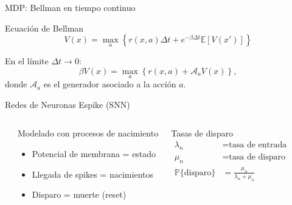 \documentclass[aspectratio=169]{beamer}
\theoremstyle{plain}
\theoremstyle{definition}
\newcommand{\E}{\mathbb{E}}
\newcommand{\Prob}{\mathbb{P}}
\newcommand{\1}{\mathbf{1}}
\begin{document}
\begin{frame}[t]{MDP: Bellman en tiempo continuo}
  \begin{block}{Ecuación de Bellman}
    \[
      V(x) = \max_a \left\{ r(x,a)\Delta t + e^{-\beta\Delta t}\E[V(x')] \right\}
    \]

    En el límite $\Delta t\to 0$:
    \[
      \beta V(x) = \max_a \left\{ r(x,a) + \mathcal{A}_a V(x) \right\},
    \]
    donde $\mathcal{A}_a$ es el generador asociado a la acción $a$.
  \end{block}
\end{frame}

\begin{frame}[t]{Redes de Neuronas Espike (SNN)}
  \begin{columns}
    \begin{center}
    \end{center}
    
    \begin{block}{Modelado con procesos de nacimiento}
      \begin{itemize}
        \item Potencial de membrana = estado
        \item Llegada de spikes = nacimientos
        \item Disparo = muerte (reset)
      \end{itemize}
    \end{block}
    
    \begin{block}{Tasas de disparo}
      \begin{align*}
        \lambda_n &= \text{tasa de entrada}\\
        \mu_n &= \text{tasa de disparo}\\
        \Prob\{\text{disparo}\} &= \frac{\mu_n}{\lambda_n+\mu_n}
      \end{align*}
      
      \vspace{0.3cm}
      \begin{center}
      \end{center}
    \end{block}
  \end{columns}
\end{frame}
\end{document}
